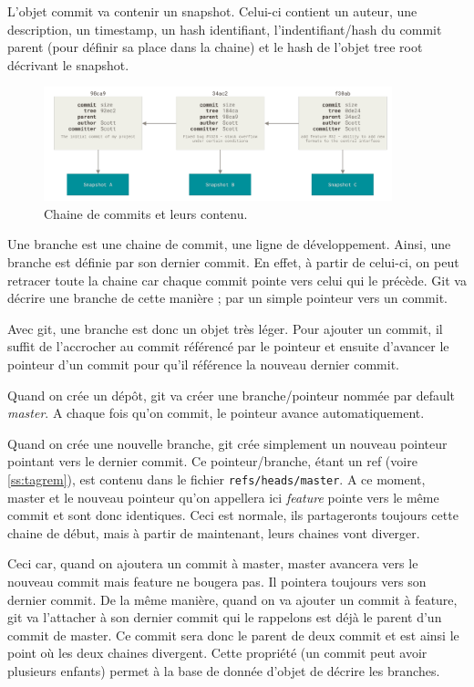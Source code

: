 \documentclass[a4paper, 12pt]{article}
\begin{document}
    L'objet commit va contenir un snapshot. Celui-ci contient un auteur, 
    une description, un timestamp, un hash identifiant, l'indentifiant/hash du
    commit parent (pour définir sa place dans la chaine) et le hash de l'objet
    tree root décrivant le snapshot. 

    \begin{figure}[H]
        \centering
        \includegraphics[width=0.9\textwidth]{figs/commits.png}
        \caption{Chaine de commits et leurs contenu.}
        \label{fig:commit}
    \end{figure}

    Une branche est une chaine de commit, une ligne de développement. Ainsi, 
    une branche est définie par son dernier commit. En effet, à partir de
    celui-ci, on peut retracer toute la chaine car chaque commit pointe vers
    celui qui le précède. Git va décrire une branche de cette manière ; par un
    simple pointeur vers un commit. 
    
    Avec git, une branche est donc un objet très léger. Pour ajouter un commit,
    il suffit de l'accrocher au commit référencé par le pointeur et ensuite
    d'avancer le pointeur d'un commit pour qu'il référence la nouveau dernier 
    commit.

    Quand on crée un dépôt, git va créer une branche/pointeur nommée par
    default \emph{master}. A chaque fois qu'on commit, le pointeur avance
    automatiquement.
    
    Quand on crée une nouvelle branche, git crée simplement un nouveau pointeur
    pointant vers le dernier commit. Ce pointeur/branche, étant un ref (voire
    \ref{ss:tagrem}), est contenu dans le fichier \lstinline{refs/heads/master}.
    A ce moment, master et le nouveau pointeur qu'on appellera ici
    \textit{feature} pointe vers le même commit et sont donc identiques. Ceci
    est normale, ils partageronts toujours cette chaine de début, mais à partir
    de maintenant, leurs chaines vont diverger.

    Ceci car, quand on ajoutera un commit à master, master avancera vers le
    nouveau commit mais feature ne bougera pas. Il pointera toujours vers son
    dernier commit. De la même manière, quand on va ajouter un commit à feature,
    git va l'attacher à son dernier commit qui le rappelons est déjà le
    parent d'un commit de master. Ce commit sera donc le parent de deux commit
    et est ainsi le point où les deux chaines divergent. Cette propriété (un
    commit peut avoir plusieurs enfants) permet à la base de donnée d'objet de
    décrire les branches.
\end{document}

